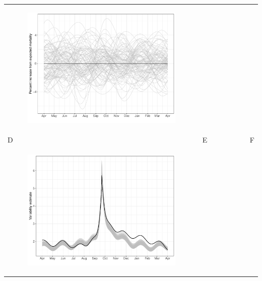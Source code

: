\documentclass[11pt]{article}
\begin{document}
\begin{suppfigure}[ht]
\begin{tabular}{lll}
\begin{subfigure}[t]{0.30\linewidth}
		\includegraphics[width=1\linewidth]{figs/supp-figure-9c.pdf}
	\end{subfigure}\\
	D&E&F\\
	\begin{subfigure}[t]{0.30\linewidth}
		\centering
		\includegraphics[width=1\linewidth]{figs/supp-figure-9d.pdf} 
	\end{subfigure}&
	\begin{subfigure}[t]{0.30\linewidth}
		\centering

\end{subfigure}
\end{tabular}
\end{suppfigure}
\end{document}
